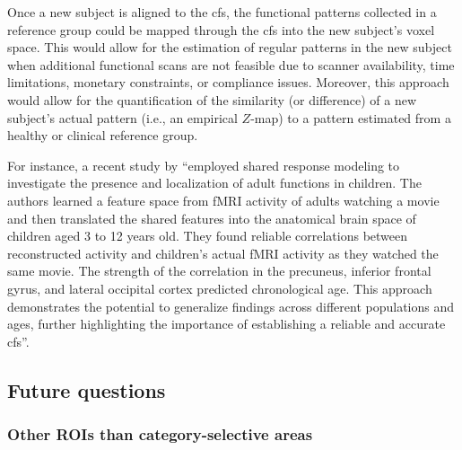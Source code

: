 %
Once a new subject is aligned to the \ac{cfs}, the functional patterns collected
in a reference group could be mapped through the \ac{cfs} into the new subject's
voxel space.
%
This would allow for the estimation of regular patterns in the new subject when
additional functional scans are not feasible due to scanner availability, time
limitations, monetary constraints, or compliance issues.
%
Moreover, this approach would allow for the quantification of the similarity (or
difference) of a new subject's actual pattern (i.e., an empirical $Z$-map) to a
pattern estimated from a healthy or clinical reference group.


%
For instance, a recent study by \citet{yates2021emergence} ``employed shared
response modeling to investigate the presence and localization of adult
functions in children.
%
The authors learned a feature space from fMRI activity of adults watching a
movie and then translated the shared features into the anatomical brain space of
children aged 3 to 12 years old.
%
They found reliable correlations between reconstructed activity and children's
actual fMRI activity as they watched the same movie.
%
The strength of the correlation in the precuneus, inferior frontal gyrus, and
lateral occipital cortex predicted chronological age.
%
This approach demonstrates the potential to generalize findings across different
populations and ages, further highlighting the importance of establishing a
reliable and accurate \ac{cfs}''.



\subsection{Future questions}



\subsubsection{Other ROIs than category-selective areas}




